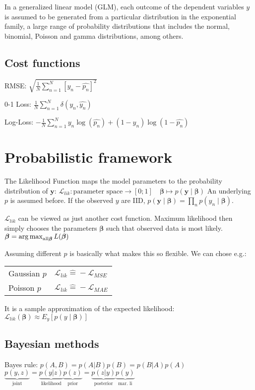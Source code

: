 \documentclass[10pt,a4paper,landscape]{article}
\renewcommand{\bf}[1]{\ensuremath{\mathbf{#1}}}
\newcommand{\bbeta}{\boldsymbol\beta}
\begin{document}
\begin{multicols*}{4}
In a generalized linear model (GLM), each outcome of the dependent variables $y$ is assumed to be generated from a particular distribution in the exponential family, a large range of probability distributions that includes the normal, binomial, Poisson and gamma distributions, among others.


\subsection{Cost functions}
RMSE: $\sqrt{\frac{1}{N} \sum_{n=1}^{N}\left[y_n- \hat{p_n} \right]^2}$

0-1 Loss: $ \frac{1}{N} \sum_{n=1}^{N} \delta(y_n, \hat{y_n})$

Log-Loss: $- \frac{1}{N}  \sum_{n=1}^{N} y_n \log(\hat{p_n}) + (1-y_n) \log(1-\hat{p_n})$

\section{Probabilistic framework}
The Likelihood Function maps the model parameters to the probability distribution of $\bf{y}$:
$\mathcal{L}_{lik}\colon \text{parameter space} \to [0;1]\quad  \bbeta \mapsto p(\bf{y} \mid  \bbeta)$
An underlying $p$ is assumed before. If the observed $y$ are IID, $p(\bf{y} \mid \bbeta) = \prod_n p(y_n \mid \bbeta)$.

$\mathcal{L}_{lik}$ can be viewed as just another cost function. Maximum likelihood then simply chooses the parameters $\bbeta$ such that observed data is most likely. $\bbeta = \argmax_{\text{all} \bbeta} L(\bbeta)$

Assuming different $p$ is basically what makes this so flexible. We can chose e.g.:

\begin{tabular}{ l  l }
  \hline
  Gaussian $p$ & $\mathcal{L}_{lik} \widehat{=} -\mathcal{L}_{MSE}$ \\
  Poisson $p$  & $\mathcal{L}_{lik} \widehat{=} -\mathcal{L}_{MAE}$ \\
  \hline
\end{tabular}

It is a sample approximation of the expected likelihood:
$\mathcal{L}_{lik}(\bbeta) \approx E_y[ p(y \mid \bbeta) ]$

\subsection{Bayesian methods}
Bayes rule: $p(A, B) = p(A|B) p(B) = p(B|A) p(A)$\\
$\underbrace{p(y,z)}_{\text{joint}} = \underbrace{p(y|z)}_{\text{likelihood}} \underbrace{p(z)}_{\text{prior}} = \underbrace{p(z|y)}_{\text{posterior}} \underbrace{p(y)}_{\text{mar. li}}$


\end{multicols*}
\end{document}
